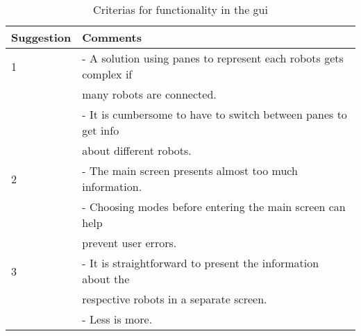 \begin{table}[h]
\begin{center}
\begin{tabular}{|l | l|} 
\hline
Suggestion  &   Comments \\
 \hline
1           &   - A solution using panes to represent each robots gets complex if\\
            &   many robots are connected. \\
            &   - It is cumbersome to have to switch between panes to get info\\
            &   about different robots. \\
\hline
2           &   - The main screen presents almost too much information. \\
            &   - Choosing modes before entering the main screen can help\\
            &   prevent user errors. \\
\hline
3           &   - It is straightforward to present the information about the\\
            &   respective robots in a separate screen. \\
            &   - Less is more. \\
\hline
\end{tabular}
\end{center}
\caption{Criterias for functionality in the \acrshort{gui}}
\label{tab:guifeedback}
\end{table}

